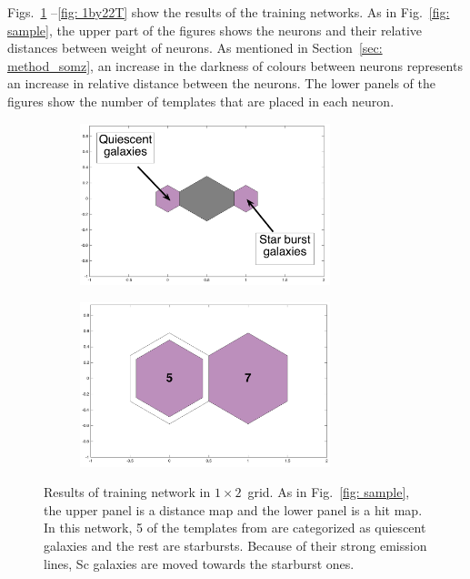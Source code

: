            Figs.~\ref{fig: 1by2T} --\ref{fig: 1by22T} show the results of the training networks.
            As in Fig.~\ref{fig: sample}, the upper part of the figures shows the neurons and their relative distances between weight of neurons.
            As mentioned in Section~\ref{sec: method_somz}, an increase in the darkness of colours between neurons represents an increase in relative distance between the neurons.
            The lower panels of the figures show the number of  templates that are placed in each neuron. 
            \begin{figure}
                \begin{subfigure}[b]{\textwidth}
                    \centering
                  \includegraphics[width=0.8\textwidth]{../image_paper2/1d/dist_1_by_2.png}
                \end{subfigure}
                \hfill
                \begin{subfigure}[b]{\textwidth}
                    \centering \includegraphics[width=0.8\textwidth]{../image_paper2/1d/hit_t_1_by_2.png}
                \end{subfigure}
                \caption[Results of training network in $1\times2$~grid]{Results of training network in $1\times2$~grid. As in Fig.~\ref{fig: sample}, the upper panel is a distance map and the lower panel is a hit map. In this network, 5 of the templates from \citet{Kinney96} are categorized as quiescent galaxies and the rest are starbursts. Because of their strong emission lines, Sc galaxies are moved towards the starburst ones.}
                 \label{fig: 1by2T}
            \end{figure}
        
